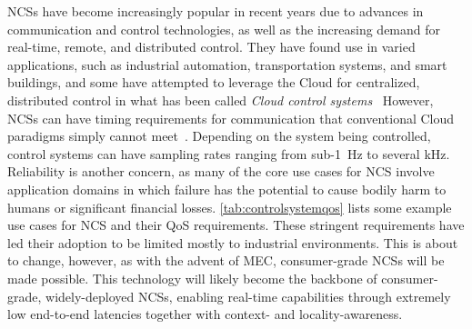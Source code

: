 

\glspl{NCS} have become increasingly popular in recent years due to advances in communication and control technologies, as well as the increasing demand for real-time, remote, and distributed control.
They have found use in varied applications, such as industrial automation, transportation systems, and smart buildings, and some have attempted to leverage the Cloud for centralized, distributed control in what has been called \emph{Cloud control systems}~\cite{xia2015cloud}
However, \glspl{NCS} can have timing requirements for communication that conventional Cloud paradigms simply cannot meet~\cite{wan2020efficient}.
Depending on the system being controlled, control systems can have sampling rates ranging from sub-\SI{1}{\hertz} to several \unit{\kilo\hertz}.
Reliability is another concern, as many of the core use cases for \gls{NCS} involve application domains in which failure has the potential to cause bodily harm to humans or significant financial losses.
\cref{tab:controlsystemqos} lists some example use cases for \gls{NCS} and their \gls{QoS} requirements.
These stringent requirements have led their adoption to be limited mostly to industrial environments.
This is about to change, however, as with the advent of \gls{MEC}, consumer-grade \glspl{NCS} will be made possible.
This technology will likely become the backbone of consumer-grade, widely-deployed \glspl{NCS}, enabling real-time capabilities through extremely low end-to-end latencies together with context- and locality-awareness.

